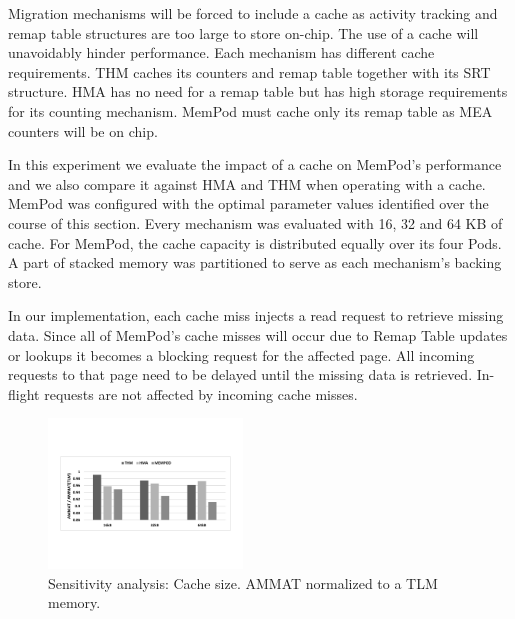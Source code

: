 Migration mechanisms will be forced to include a cache as activity tracking and remap table structures are too large to store on-chip. The use of a cache will unavoidably hinder performance. Each mechanism has different cache requirements. THM caches its counters and remap table together with its SRT structure. HMA has no need for a remap table but has high storage requirements for its counting mechanism. MemPod must cache only its remap table as MEA counters will be on chip. 

In this experiment we evaluate the impact of a cache on MemPod's performance and we also compare it against HMA and THM when operating with a cache. MemPod was configured with the optimal parameter values identified over the course of this section. Every mechanism was evaluated with 16, 32 and 64 KB of cache. For MemPod, the cache capacity is distributed equally over its four Pods. A part of stacked memory was partitioned to serve as each mechanism's backing store.

In our implementation, each cache miss injects a read request to retrieve missing data. Since all of MemPod's cache misses will occur due to Remap Table updates or lookups it becomes a blocking request for the affected page. All incoming requests to that page need to be delayed until the missing data is retrieved. In-flight requests are not affected by incoming cache misses.


\begin{figure}[h]
  \includegraphics[width=0.46\textwidth]{figures/revised/new/cache_norm_tlm.pdf}
  \caption{Sensitivity analysis: Cache size. AMMAT normalized to a TLM memory.}
  \label{fig:cache_norm_tlm}
\end{figure}

